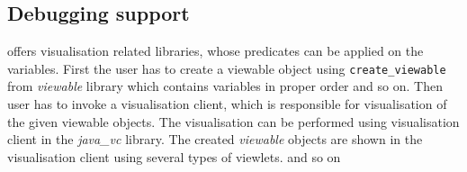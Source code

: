\subsection{Debugging support}
\eclipse offers visualisation related libraries, whose predicates can be applied 
on the variables. First the user has to create a viewable object using \texttt{create\_viewable}
from {\em viewable} library which contains variables in proper order and so on. Then
user has to invoke a visualisation client, which is responsible for visualisation of the 
given viewable objects. The visualisation can be performed using  visualisation client
in the {\em java\_vc} library. The created {\em viewable} objects are shown in
the visualisation client using several types of viewlets. and so on 
